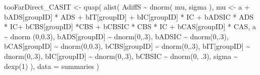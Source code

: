\documentclass[
  10pt,
  dvipsnames,enabledeprecatedfontcommands]{scrartcl}
\newenvironment{Shaded}{\begin{snugshade}}{\end{snugshade}}
\newcommand{\AttributeTok}[1]{\textcolor[rgb]{0.77,0.63,0.00}{#1}}
\newcommand{\DecValTok}[1]{\textcolor[rgb]{0.00,0.00,0.81}{#1}}
\newcommand{\FloatTok}[1]{\textcolor[rgb]{0.00,0.00,0.81}{#1}}
\newcommand{\FunctionTok}[1]{\textcolor[rgb]{0.00,0.00,0.00}{#1}}
\newcommand{\NormalTok}[1]{#1}
\newcommand{\OtherTok}[1]{\textcolor[rgb]{0.56,0.35,0.01}{#1}}
\newcommand{\SpecialCharTok}[1]{\textcolor[rgb]{0.00,0.00,0.00}{#1}}
\begin{document}
\begin{Shaded}
\begin{Highlighting}[]
\NormalTok{tooFarDirect\_CASIT }\OtherTok{\textless{}{-}} \FunctionTok{quap}\NormalTok{(}
  \FunctionTok{alist}\NormalTok{(}
\NormalTok{    AdiffS }\SpecialCharTok{\textasciitilde{}} \FunctionTok{dnorm}\NormalTok{( mu, sigma ),}
\NormalTok{    mu }\OtherTok{\textless{}{-}}\NormalTok{ a }\SpecialCharTok{+}\NormalTok{ bADS[groupID] }\SpecialCharTok{*}\NormalTok{ ADS }\SpecialCharTok{+}\NormalTok{  bIT[groupID] }\SpecialCharTok{+}\NormalTok{ bIC[groupID] }\SpecialCharTok{*}\NormalTok{ IC }\SpecialCharTok{+} 
\NormalTok{      bADSIC }\SpecialCharTok{*}\NormalTok{ ADS }\SpecialCharTok{*}\NormalTok{ IC}\SpecialCharTok{+}\NormalTok{ bCBS[groupID] }\SpecialCharTok{*}\NormalTok{CBS }\SpecialCharTok{+}\NormalTok{ bCBSIC }\SpecialCharTok{*}\NormalTok{ CBS }\SpecialCharTok{*}\NormalTok{ IC }\SpecialCharTok{+}\NormalTok{ bCAS[groupID] }\SpecialCharTok{*}\NormalTok{ CAS, }
\NormalTok{    a }\SpecialCharTok{\textasciitilde{}} \FunctionTok{dnorm}\NormalTok{ (}\DecValTok{0}\NormalTok{,}\FloatTok{0.3}\NormalTok{),}
\NormalTok{    bADS[groupID] }\SpecialCharTok{\textasciitilde{}} \FunctionTok{dnorm}\NormalTok{(}\DecValTok{0}\NormalTok{,.}\DecValTok{3}\NormalTok{),}
\NormalTok{    bADSIC }\SpecialCharTok{\textasciitilde{}} \FunctionTok{dnorm}\NormalTok{(}\DecValTok{0}\NormalTok{,.}\DecValTok{3}\NormalTok{),}
\NormalTok{    bCAS[groupID] }\SpecialCharTok{\textasciitilde{}} \FunctionTok{dnorm}\NormalTok{(}\DecValTok{0}\NormalTok{,}\FloatTok{0.3}\NormalTok{),}
\NormalTok{    bCBS[groupID] }\SpecialCharTok{\textasciitilde{}} \FunctionTok{dnorm}\NormalTok{(}\DecValTok{0}\NormalTok{,.}\DecValTok{3}\NormalTok{),}
\NormalTok{    bIT[groupID] }\SpecialCharTok{\textasciitilde{}} \FunctionTok{dnorm}\NormalTok{(}\DecValTok{0}\NormalTok{,.}\DecValTok{3}\NormalTok{),}
\NormalTok{    bIC[groupID] }\SpecialCharTok{\textasciitilde{}} \FunctionTok{dnorm}\NormalTok{(}\DecValTok{0}\NormalTok{,.}\DecValTok{3}\NormalTok{),}
\NormalTok{    bCBSIC }\SpecialCharTok{\textasciitilde{}} \FunctionTok{dnorm}\NormalTok{(}\DecValTok{0}\NormalTok{, .}\DecValTok{3}\NormalTok{),}
\NormalTok{    sigma  }\SpecialCharTok{\textasciitilde{}} \FunctionTok{dexp}\NormalTok{(}\DecValTok{1}\NormalTok{)}
\NormalTok{  ), }
  \AttributeTok{data =}\NormalTok{ summaries}
\NormalTok{)}




\end{Highlighting}
\end{Shaded}
\end{document}
